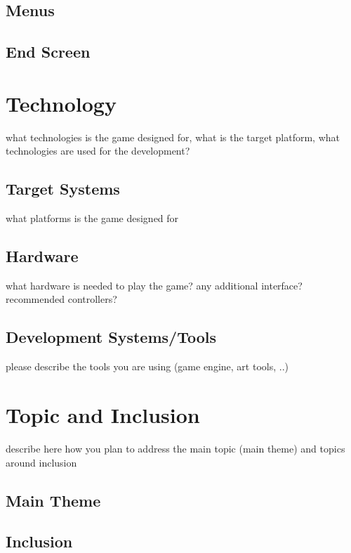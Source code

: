 \documentclass[a4paper]{scrreprt}
\begin{document}
\section{Menus}

\section{End Screen}



\chapter{Technology}
what technologies is the game designed for, what is the target platform, what technologies are used for the development? 

\section{Target Systems}
what platforms is the game designed for

\section{Hardware}
what hardware is needed to play the game? any additional interface? recommended controllers? 

\section{Development Systems/Tools}
please describe the tools you are using (game engine, art tools, ..) 



\chapter{Topic and Inclusion }

describe here how you plan to address the main topic (main theme) and topics around inclusion

\section{Main Theme}
\section{Inclusion}
\end{document}
